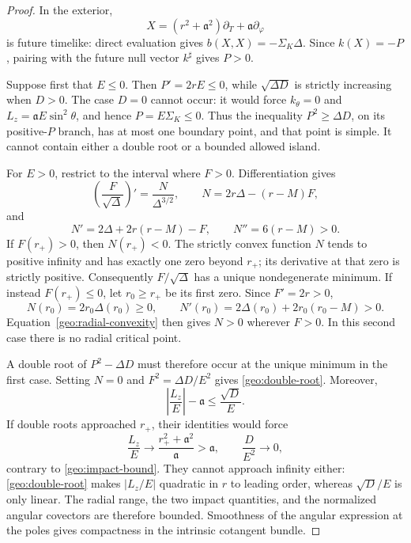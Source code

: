 \begin{proof}
In the exterior,
\[
 X=(r^2+\mathfrak a^2)\partial_T+\mathfrak a\partial_\varphi
\]
is future timelike: direct evaluation gives
$b(X,X)=-\Sigma_K\Delta$.  Since $k(X)=-P$, pairing with the future
null vector $k^\sharp$ gives $P>0$.

Suppose first that $E\leq0$.  Then $P'=2rE\leq0$, while
$\sqrt{\Delta D}$ is strictly increasing when $D>0$.  The case $D=0$
cannot occur: it would force $k_\theta=0$ and
$L_z=\mathfrak a E\sin^2\theta$, and hence $P=E\Sigma_K\leq0$.
Thus the inequality $P^2\geq\Delta D$, on its positive-$P$ branch,
has at most one boundary point, and that point is simple.  It cannot
contain either a double root or a bounded allowed island.

For $E>0$, restrict to the interval where $F>0$.  Differentiation gives
\begin{equation}
 \left(\frac{F}{\sqrt\Delta}\right)'
       =\frac{N}{\Delta^{3/2}},\qquad
 N=2r\Delta-(r-M)F,
 \label{geo:radial-derivative}
\end{equation}
and
\begin{equation}
 N'=2\Delta+2r(r-M)-F,\qquad N''=6(r-M)>0.
 \label{geo:radial-convexity}
\end{equation}
If $F(r_+)>0$, then $N(r_+)<0$.  The strictly convex function $N$
tends to positive infinity and has exactly one zero beyond $r_+$;
its derivative at that zero is strictly positive.  Consequently
$F/\sqrt\Delta$ has a unique nondegenerate minimum.  If instead
$F(r_+)\leq0$, let $r_0\geq r_+$ be its first zero.  Since
$F'=2r>0$,
\[
 N(r_0)=2r_0\Delta(r_0)\geq0,\qquad
 N'(r_0)=2\Delta(r_0)+2r_0(r_0-M)>0.
\]
Equation~\eqref{geo:radial-convexity} then gives $N>0$ wherever
$F>0$.  In this second case there is no radial critical point.

A double root of $P^2-\Delta D$ must therefore occur at the unique
minimum in the first case.  Setting $N=0$ and
$F^2=\Delta D/E^2$ gives \eqref{geo:double-root}.  Moreover,
\begin{equation}
 \left|\frac{L_z}{E}\right|-\mathfrak a
                  \leq\frac{\sqrt D}{E}.
 \label{geo:impact-bound}
\end{equation}
If double roots approached $r_+$, their identities would force
\[
 \frac{L_z}{E}\longrightarrow
       \frac{r_+^2+\mathfrak a^2}{\mathfrak a}>\mathfrak a,
 \qquad \frac{D}{E^2}\longrightarrow0,
\]
contrary to \eqref{geo:impact-bound}.  They cannot approach infinity
either: \eqref{geo:double-root} makes $|L_z/E|$ quadratic in $r$ to
leading order, whereas $\sqrt D/E$ is only linear.  The radial range,
the two impact quantities, and the normalized angular covectors are
therefore bounded.  Smoothness of the angular expression at the poles
gives compactness in the intrinsic cotangent bundle.


\end{proof}
